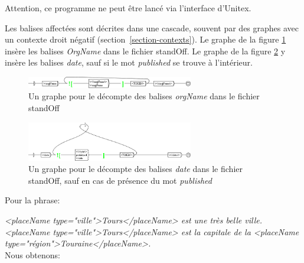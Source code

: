 \noindent Attention, ce programme ne peut être lancé via l'interface d'Unitex.


Les balises affectées sont décrites dans une cascade, souvent par des graphes avec un contexte droit négatif (section~\ref{section-contexts}). Le graphe de la figure \ref{standOffOrgName} insère les balises \emph{OrgName} dans le fichier standOff. Le graphe de la figure \ref{standOffDate} y insère les balises \emph{date}, sauf si le mot \emph{published} se trouve à l'intérieur.


\begin{figure}[!htb]
  \centering
  \includegraphics[width=7.28cm]{resources/img/grfOrgName.png}
  \caption{Un graphe pour le décompte des balises \emph{orgName} dans le fichier standOff}
  \label{standOffOrgName}
\end{figure}


\begin{figure}[!htb]
  \centering
  \includegraphics[width=7.28cm]{resources/img/grfDate.png}
  \caption{Un graphe pour le décompte des balises \emph{date} dans le fichier standOff, sauf en cas de présence du mot \emph{published}}
  \label{standOffDate}
\end{figure}

\noindent Pour la phrase:

\bigskip
\noindent \emph{<placeName type="ville">Tours</placeName> est une très belle ville. <placeName type="ville">Tours</placeName> est la capitale de la <placeName type="région">Touraine</placeName>.}\\

Nous obtenons:

